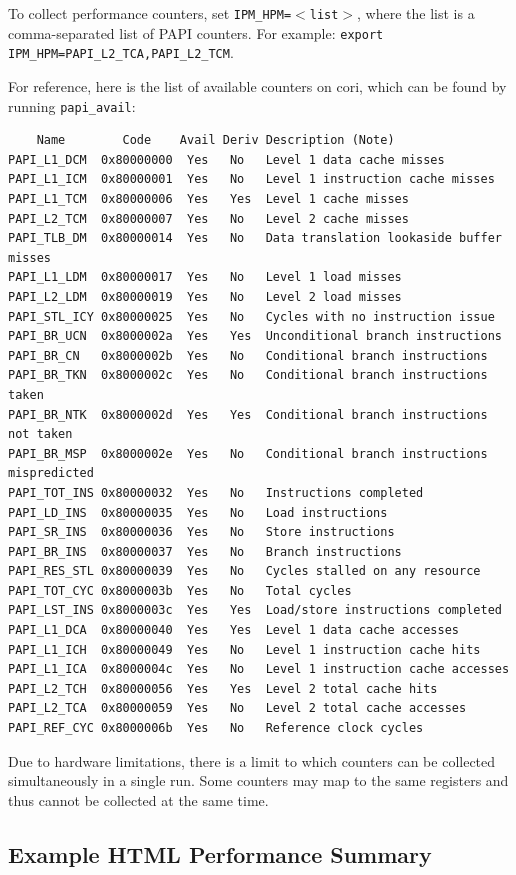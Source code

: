To collect performance counters, set {\tt IPM\_HPM=$<$list$>$}, where the list is a comma-separated
list of PAPI counters.  For example: {\tt export IPM\_HPM=PAPI\_L2\_TCA,PAPI\_L2\_TCM}.

For reference, here is the list of available counters on cori, which can be found by running {\tt papi\_avail}:
\begin{verbatim}
    Name        Code    Avail Deriv Description (Note)
PAPI_L1_DCM  0x80000000  Yes   No   Level 1 data cache misses
PAPI_L1_ICM  0x80000001  Yes   No   Level 1 instruction cache misses
PAPI_L1_TCM  0x80000006  Yes   Yes  Level 1 cache misses
PAPI_L2_TCM  0x80000007  Yes   No   Level 2 cache misses
PAPI_TLB_DM  0x80000014  Yes   No   Data translation lookaside buffer misses
PAPI_L1_LDM  0x80000017  Yes   No   Level 1 load misses
PAPI_L2_LDM  0x80000019  Yes   No   Level 2 load misses
PAPI_STL_ICY 0x80000025  Yes   No   Cycles with no instruction issue
PAPI_BR_UCN  0x8000002a  Yes   Yes  Unconditional branch instructions
PAPI_BR_CN   0x8000002b  Yes   No   Conditional branch instructions
PAPI_BR_TKN  0x8000002c  Yes   No   Conditional branch instructions taken
PAPI_BR_NTK  0x8000002d  Yes   Yes  Conditional branch instructions not taken
PAPI_BR_MSP  0x8000002e  Yes   No   Conditional branch instructions mispredicted
PAPI_TOT_INS 0x80000032  Yes   No   Instructions completed
PAPI_LD_INS  0x80000035  Yes   No   Load instructions
PAPI_SR_INS  0x80000036  Yes   No   Store instructions
PAPI_BR_INS  0x80000037  Yes   No   Branch instructions
PAPI_RES_STL 0x80000039  Yes   No   Cycles stalled on any resource
PAPI_TOT_CYC 0x8000003b  Yes   No   Total cycles
PAPI_LST_INS 0x8000003c  Yes   Yes  Load/store instructions completed
PAPI_L1_DCA  0x80000040  Yes   Yes  Level 1 data cache accesses
PAPI_L1_ICH  0x80000049  Yes   No   Level 1 instruction cache hits
PAPI_L1_ICA  0x8000004c  Yes   No   Level 1 instruction cache accesses
PAPI_L2_TCH  0x80000056  Yes   Yes  Level 2 total cache hits
PAPI_L2_TCA  0x80000059  Yes   No   Level 2 total cache accesses
PAPI_REF_CYC 0x8000006b  Yes   No   Reference clock cycles
\end{verbatim}

Due to hardware limitations, there is a limit to which counters can be
collected simultaneously in a single run.  Some counters may map to the
same registers and thus cannot be collected at the same time.

\subsection{Example HTML Performance Summary}

